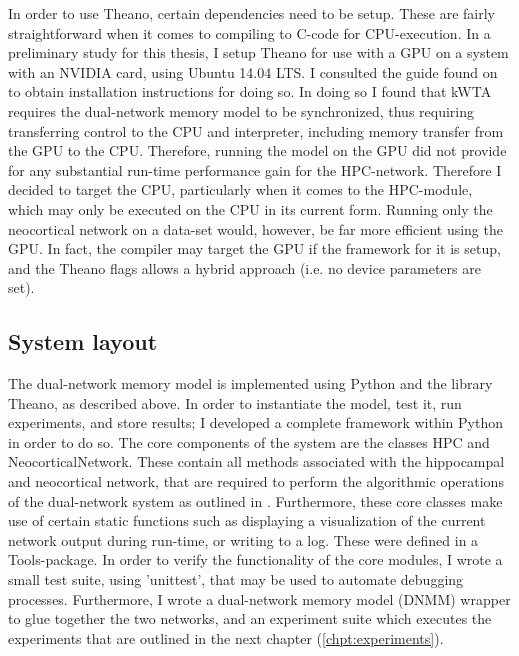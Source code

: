 In order to use Theano, certain dependencies need to be setup. These are fairly straightforward when it comes to compiling to C-code for CPU-execution. In a preliminary study for this thesis, I setup Theano for use with a GPU on a system with an NVIDIA card, using Ubuntu 14.04 LTS. I consulted the guide found on \citep{LISA-lab2015b} to obtain installation instructions for doing so. In doing so I found that kWTA requires the dual-network memory model to be synchronized, thus requiring transferring control to the CPU and interpreter, including memory transfer from the GPU to the CPU. Therefore, running the model on the GPU did not provide for any substantial run-time performance gain for the HPC-network. Therefore I decided to target the CPU, particularly when it comes to the HPC-module, which may only be executed on the CPU in its current form. Running only the neocortical network on a data-set would, however, be far more efficient using the GPU. In fact, the compiler may target the GPU if the framework for it is setup, and the Theano flags allows a hybrid approach (i.e. no device parameters are set).

\subsection{System layout}

The dual-network memory model is implemented using Python and the library Theano, as described above. In order to instantiate the model, test it, run experiments, and store results; I developed a complete framework within Python in order to do so. The core components of the system are the classes HPC and NeocorticalNetwork. These contain all methods associated with the hippocampal and neocortical network, that are required to perform the algorithmic operations of the dual-network system as outlined in \citep{Hattori2014}. Furthermore, these core classes make use of certain static functions such as displaying a visualization of the current network output during run-time, or writing to a log. These were defined in a Tools-package. In order to verify the functionality of the core modules, I wrote a small test suite, using 'unittest', that may be used to automate debugging processes. Furthermore, I wrote a dual-network memory model (DNMM) wrapper to glue together the two networks, and an experiment suite which executes the experiments that are outlined in the next chapter (\ref{chpt:experiments}).

